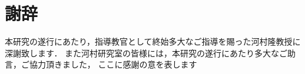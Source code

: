\documentclass[main]{subfiles}
\begin{document}
{}
\chapter*{謝辞}
本研究の遂行にあたり，指導教官として終始多大なご指導を賜った河村隆教授に深謝致します．
また河村研究室の皆様には，本研究の遂行にあたり多大なご助言，ご協力頂きました，
ここに感謝の意を表します
\end{document}
